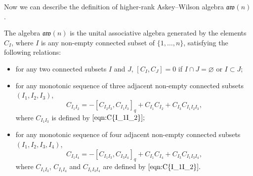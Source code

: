 \documentclass[pdftex]{sigma}
\numberwithin{equation}{section}
\def\aw{\mathfrak{aw}}
\begin{document}
Now we can describe the definition of higher-rank Askey--Wilson algebra $\aw(n)$.

\begin{Definition} \label{defn:aw(n)}
The algebra $\aw(n)$ is the unital associative algebra generated by the elements $C_I$, where $I$ is any non-empty connected subset of $\{1, \ldots, n\}$, satisfying the following relations:
\begin{itemize}\itemsep=0pt
 \item for any two connected subsets $I$ and $J$,
$[C_I, C_J]=0$ if $I \cap J=\varnothing$ or $I \subset J$;
 \item for any monotonic sequence of three adjacent non-empty connected subsets $(I_1, I_2, I_3)$,
\begin{equation*}
C_{I_1 I_2}=-[C_{I_2 I_3}, C_{I_1 I_3}]_q+C_{I_1} C_{I_2}+C_{I_3} C_{I_1 I_2 I_3},
\end{equation*}
where $C_{I_1 I_3}$ is defined by $\eqref{eqn:C{I_1I_2}};$
 \item for any monotonic sequence of four adjacent non-empty connected subsets $(I_1, I_2, I_3, I_4)$,
\begin{equation*}
C_{I_1 I_4}=-\left[C_{I_1 I_3}, C_{I_3 I_4}\right]_q+C_{I_1} C_{I_4}+C_{I_3} C_{I_1 I_3 I_4},
\end{equation*}
where $C_{I_1 I_3}$, $C_{I_1 I_4}$ and $C_{I_1 I_3 I_4}$ are defined by $\eqref{eqn:C{I_1I_2}}.$
\end{itemize}
\end{Definition}
\end{document}

